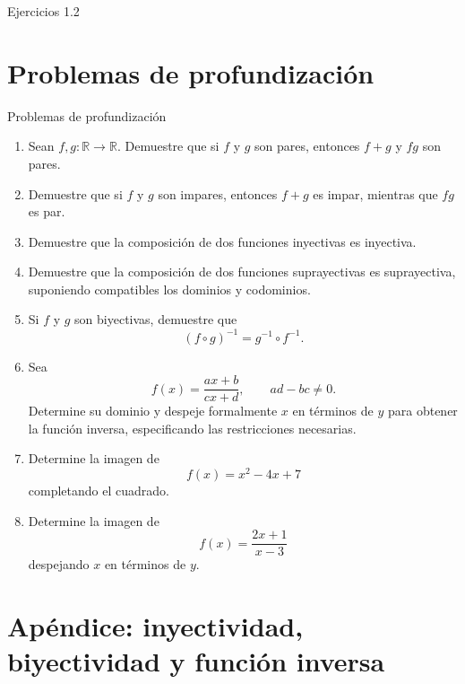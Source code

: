 \documentclass[aspectratio=169,10pt]{beamer}
\newcommand{\R}{\mathbb{R}}
\begin{document}
\begin{frame}{Ejercicios 1.2}
\end{frame}
\section{Problemas de profundización}
\begin{frame}{Problemas de profundización}
\begin{enumerate}
    \item Sean $f,g:\R\to\R$. Demuestre que si $f$ y $g$ son pares, entonces
    $f+g$ y $fg$ son pares.

    \item Demuestre que si $f$ y $g$ son impares, entonces $f+g$ es impar,
    mientras que $fg$ es par.

    \item Demuestre que la composición de dos funciones inyectivas es
    inyectiva.

    \item Demuestre que la composición de dos funciones suprayectivas es
    suprayectiva, suponiendo compatibles los dominios y codominios.

    \item Si $f$ y $g$ son biyectivas, demuestre que
    \[
    (f\circ g)^{-1}=g^{-1}\circ f^{-1}.
    \]

    \item Sea
    \[
    f(x)=\frac{ax+b}{cx+d},
    \qquad ad-bc\neq0.
    \]
    Determine su dominio y despeje formalmente $x$ en términos de $y$ para
    obtener la función inversa, especificando las restricciones necesarias.

    \item Determine la imagen de
    \[
    f(x)=x^2-4x+7
    \]
    completando el cuadrado.

    \item Determine la imagen de
    \[
    f(x)=\frac{2x+1}{x-3}
    \]
    despejando $x$ en términos de $y$.
\end{enumerate}

\end{frame}
\appendix
\section{Apéndice: inyectividad, biyectividad y función inversa}
\end{document}
